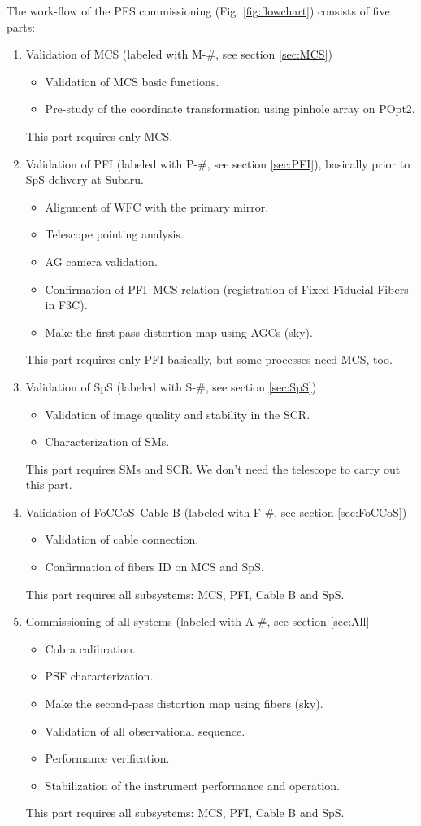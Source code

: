 The work-flow of the PFS commissioning (Fig. \ref{fig:flowchart}) consists of five parts: 
\begin{enumerate}
\item Validation of MCS (labeled with M-\#, see section \ref{sec:MCS})
 \begin{itemize}
 \item Validation of MCS basic functions.
 \item Pre-study of the coordinate transformation using pinhole array on POpt2.
 \end{itemize}
This part requires only MCS.
\item Validation of PFI (labeled with P-\#, see section \ref{sec:PFI}), basically prior to SpS delivery at Subaru.
 \begin{itemize}
 \item Alignment of WFC with the primary mirror.
 \item Telescope pointing analysis.
 \item AG camera validation.
 \item Confirmation of PFI--MCS relation (registration of Fixed Fiducial Fibers in F3C).
 \item Make the first-pass distortion map using AGCs (sky).
 \end{itemize}
This part requires only PFI basically, but some processes need MCS, too.
\item Validation of SpS (labeled with S-\#, see section \ref{sec:SpS})
 \begin{itemize}
 \item Validation of image quality and stability in the SCR.
 \item Characterization of SMs.
 \end{itemize}
This part requires SMs and SCR.
We don't need the telescope to carry out this part.
\item Validation of FoCCoS--Cable B (labeled with F-\#, see section \ref{sec:FoCCoS})
 \begin{itemize}
 \item Validation of cable connection.
 \item Confirmation of fibers ID on MCS and SpS.
 \end{itemize}
This part requires all subsystems: MCS, PFI, Cable B and SpS.
\item Commissioning of all systems (labeled with A-\#, see section \ref{sec:All}
 \begin{itemize}
 \item Cobra calibration.
 \item PSF characterization.
 \item Make the second-pass distortion map using fibers (sky).
 \item Validation of all observational sequence.
 \item Performance verification.
 \item Stabilization of the instrument performance and operation.
 \end{itemize}
This part requires all subsystems: MCS, PFI, Cable B and SpS.
\end{enumerate}

